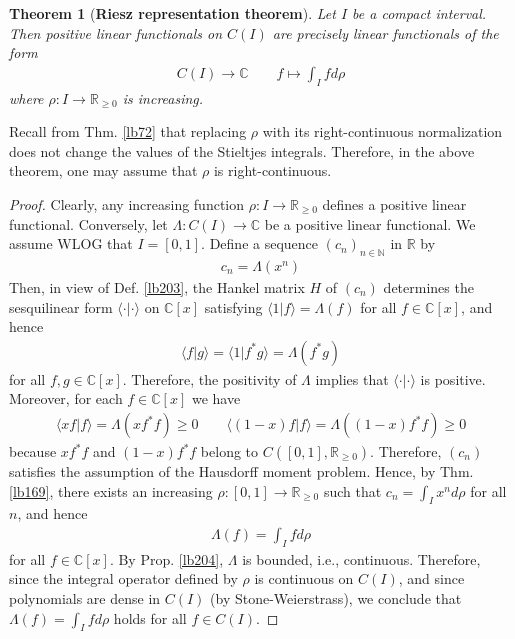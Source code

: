 \documentclass[12pt,b5paper,notitlepage]{article}
\theoremstyle{definition}
\theoremstyle{plain}
\newtheorem{thm}[df]{Theorem}
\newcommand{\bk}[1]{\langle {#1}\rangle}
\newcommand{\Cbb}{\mathbb C}
\newcommand{\Nbb}{\mathbb N}
\newcommand{\Rbb}{\mathbb R}
\numberwithin{equation}{section}
\begin{document}
\begin{thm}[\textbf{Riesz representation theorem}]\label{lb206}
Let $I$ be a compact interval. Then positive linear functionals on $C(I)$ are precisely linear functionals of the form
\begin{align*}
C(I)\rightarrow\Cbb\qquad f\mapsto \int_Ifd\rho
\end{align*}
where $\rho:I\rightarrow\Rbb_{\geq0}$ is increasing.
\end{thm}

Recall from Thm. \ref{lb72} that replacing $\rho$ with its right-continuous normalization does not change the values of the Stieltjes integrals. Therefore, in the above theorem, one may assume that $\rho$ is right-continuous.

\begin{proof}
Clearly, any increasing function $\rho:I\rightarrow\Rbb_{\geq0}$ defines a positive linear functional. Conversely, let $\Lambda:C(I)\rightarrow\Cbb$ be a positive linear functional. We assume WLOG that $I=[0,1]$. Define a sequence $(c_n)_{n\in\Nbb}$ in $\Rbb$ by
\begin{align*}
c_n=\Lambda(x^n)
\end{align*}
Then, in view of Def. \ref{lb203}, the Hankel matrix $H$ of $(c_n)$ determines the sesquilinear form $\bk{\cdot|\cdot}$ on $\Cbb[x]$ satisfying $\bk{1|f}=\Lambda(f)$ for all $f\in\Cbb[x]$, and hence
\begin{align*}
\bk{f|g}=\bk{1|f^*g}=\Lambda(f^*g)
\end{align*}
for all $f,g\in\Cbb[x]$. Therefore, the positivity of $\Lambda$ implies that $\bk{\cdot|\cdot}$ is positive. Moreover, for each $f\in\Cbb[x]$ we have
\begin{align*}
\bk{xf|f}=\Lambda(xf^*f)\geq0\qquad \bk{(1-x)f|f}=\Lambda((1-x)f^*f)\geq0
\end{align*}
because $xf^*f$ and $(1-x)f^*f$ belong to $C([0,1],\Rbb_{\geq0})$. Therefore, $(c_n)$ satisfies the assumption of the Hausdorff moment problem. Hence, by Thm. \ref{lb169}, there exists an increasing $\rho:[0,1]\rightarrow\Rbb_{\geq0}$ such that $c_n=\int_Ix^nd\rho$ for all $n$, and hence
\begin{align*}
\Lambda(f)=\int_Ifd\rho
\end{align*}
for all $f\in\Cbb[x]$. By Prop. \ref{lb204}, $\Lambda$ is bounded, i.e., continuous. Therefore, since the integral operator defined by $\rho$ is continuous on $C(I)$, and since polynomials are dense in $C(I)$ (by Stone-Weierstrass), we conclude that $\Lambda(f)=\int_Ifd\rho$ holds for all $f\in C(I)$.
\end{proof}
\end{document}

